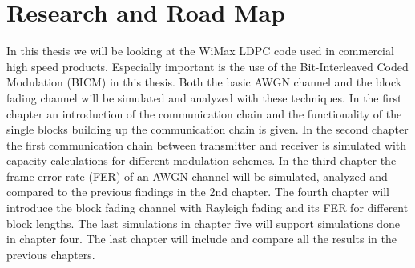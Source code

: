 \clearpage

\section{Research and Road Map}
In this thesis we will be looking at the WiMax LDPC code used in commercial high speed products. Especially important is the use of the Bit-Interleaved Coded Modulation (BICM) in this thesis. Both the basic AWGN channel and the block fading channel will be simulated and analyzed with these techniques.
\newline
In the first chapter an introduction of the communication chain and the functionality of the single blocks building up the communication chain is given.
In the second chapter the first communication chain between transmitter and receiver is simulated with capacity calculations for different modulation schemes.
In the third chapter the frame error rate (FER) of an AWGN channel will be simulated, analyzed and compared to the previous findings in the 2nd chapter.
The fourth chapter will introduce the block fading channel with Rayleigh fading and its FER for different block lengths.
The last simulations in chapter five will support simulations done in chapter four.
The last chapter will include and compare all the results in the previous chapters.



\clearpage

